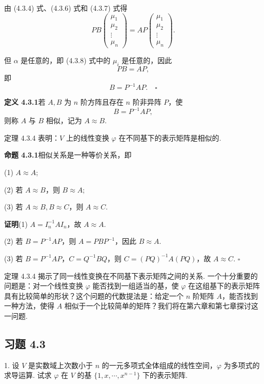 \documentclass[UTF8,12pt,a4paper,fontset=fandol]{ctexart}
\begin{document}
由 (4.3.4) 式、(4.3.6) 式和 (4.3.7) 式得
\begin{equation}
PB
\left(\begin{array}{c}
\mu_1\\
\mu_2\\
\vdots\\
\mu_n
\end{array}\right)
=AP
\left(\begin{array}{c}
\mu_1\\
\mu_2\\
\vdots\\
\mu_n
\end{array}\right).
\tag{4.3.8}
\end{equation}

但 $\alpha$ 是任意的，即 (4.3.8) 式中的 $\mu_i$ 是任意的，因此
\[
PB=AP,
\]
即
\[
B=P^{-1}AP. \quad \square
\]

\noindent\textbf{定义 4.3.1}\quad 若 $A,B$ 为 $n$ 阶方阵且存在 $n$ 阶非异阵 $P$，使
\[
B=P^{-1}AP,
\]
则称 $A$ 与 $B$ 相似，记为 $A\approx B$.

定理 4.3.4 表明：$V$ 上的线性变换 $\varphi$ 在不同基下的表示矩阵是相似的.

\noindent\textbf{命题 4.3.1}\quad 相似关系是一种等价关系，即

(1) $A\approx A$;

(2) 若 $A\approx B$，则 $B\approx A$;

(3) 若 $A\approx B,B\approx C$，则 $A\approx C$.

\noindent\textbf{证明}\quad (1) $A=I_n^{-1}AI_n$，故 $A\approx A$.

(2) 若 $B=P^{-1}AP$，则 $A=PBP^{-1}$，因此 $B\approx A$.

(3) 若 $B=P^{-1}AP$，$C=Q^{-1}BQ$，则 $C=(PQ)^{-1}A(PQ)$，故 $A\approx C$. $\square$

定理 4.3.4 揭示了同一线性变换在不同基下表示矩阵之间的关系. 一个十分重要的问题是：对一个线性变换 $\varphi$ 能否找到一组适当的基，使 $\varphi$ 在这组基下的表示矩阵具有比较简单的形状？这个问题的代数提法是：给定一个 $n$ 阶矩阵 $A$，能否找到一种方法，使得 $A$ 相似于一个比较简单的矩阵？我们将在第六章和第七章探讨这一问题.

\subsection*{习题 4.3}

1. 设 $V$ 是实数域上次数小于 $n$ 的一元多项式全体组成的线性空间，$\varphi$ 为多项式的求导运算. 试求 $\varphi$ 在 $V$ 的基 $\{1,x,\cdots,x^{n-1}\}$ 下的表示矩阵.
\end{document}

